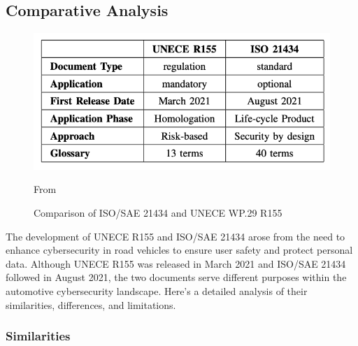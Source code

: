 \subsection{Comparative Analysis}\label{subsec:comparative-analysis}
\begin{figure}[!htb]
    \centering
    \includegraphics[width=0.7\linewidth]{figures/diff-standards}
    \caption{Comparison of ISO/SAE 21434 and UNECE WP.29 R155}
    \footnotesize{From \cite{comparison-standard} }
    \label{fig:comparison}
\end{figure}

The development of UNECE R155 and ISO/SAE 21434 arose from the need to enhance cybersecurity in road vehicles to ensure user safety and protect personal data. Although UNECE R155 was released in March 2021 and ISO/SAE 21434 followed in August 2021, the two documents serve different purposes within the automotive cybersecurity landscape. Here’s a detailed analysis of their similarities, differences, and limitations.

\subsubsection{Similarities}

